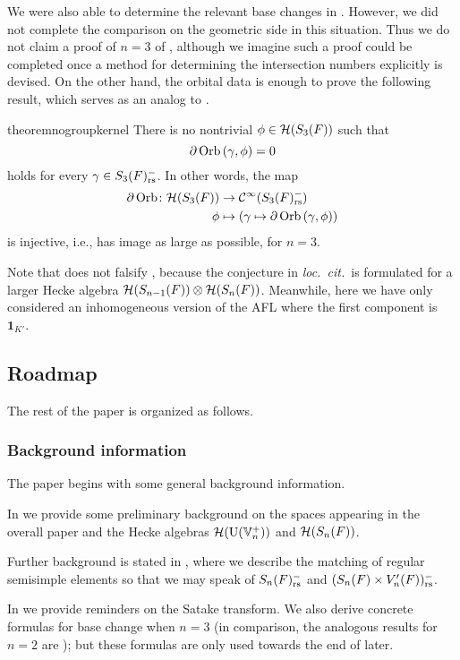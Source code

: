 We were also able to determine the
relevant base changes in .
However, we did not complete the comparison on the geometric side in this situation.
Thus we do not claim a proof of $n = 3$ of ,
although we imagine such a proof could be completed
once a method for determining the intersection numbers explicitly is devised.
On the other hand, the orbital data is enough to prove the following result,
which serves as an analog to .
\begin{restatable}{theorem}{nogroupkernel}
  \label{thm:no_kernel_group}
  There is no nontrivial $\phi \in \mathcal H(S_3(F))$ such that
  \[ \partial \operatorname{Orb} \left( \gamma, \phi \right) = 0 \]
  holds for every $\gamma \in S_3(F)_{\mathrm{rs}}^-$.
  In other words, the map
  \begin{align*}
    \partial\operatorname{Orb} \colon \mathcal H(S_3(F)) &\to \mathcal{C}^\infty(S_3(F)_{\mathrm{rs}}^-) \\
    \phi &\mapsto \left( \gamma \mapsto \partial \operatorname{Orb} \left(\gamma, \phi \right) \right)
  \end{align*}
  is injective, i.e., has image as large as possible, for $n = 3$.
\end{restatable}
\begin{remark}
  Note that  does not falsify
  \cite[Conjecture 1.0.2]{ref:AFLspherical},
  because the conjecture in \emph{loc.\ cit.}\ is formulated
  for a larger Hecke algebra $\mathcal H(S_{n-1}(F)) \otimes \mathcal H(S_n(F))$.
  Meanwhile, here we have only considered an inhomogeneous version of the AFL
  where the first component is $\mathbf{1}_{K'}$.
\end{remark}
\fi

\subsection{Roadmap}
The rest of the paper is organized as follows.

\subsubsection{Background information}
The paper begins with some general background information.
\begin{itemize}
  \ii In  we provide some preliminary background
  on the spaces appearing in the overall paper and the Hecke algebras
  $\mathcal H(\operatorname{U}(\mathbb V_n^+))$ and $\mathcal H(S_n(F))$.

  \ii Further background is stated in ,
  where we describe the matching of regular semisimple elements
  so that we may speak of $S_n(F)_{\mathrm{rs}}^-$ and $(S_n(F) \times V'_n(F))_{\mathrm{rs}}^-$.

  \ii In  we provide reminders on the Satake transform.
  \ifthesis
  We also derive concrete formulas for base change when $n = 3$
  (in comparison, the analogous results for $n=2$ are
  \cite[Lemma 7.1.1]{ref:AFLspherical});
  but these formulas are only used towards the end of  later.
  \fi
\end{itemize}

